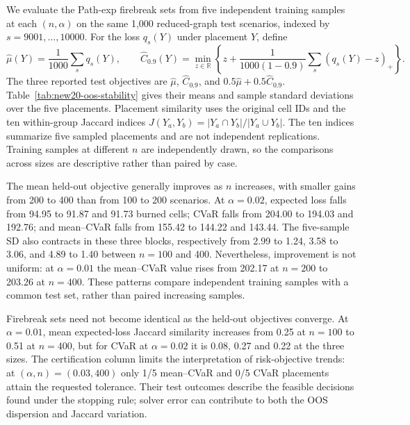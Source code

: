We evaluate the Path-exp firebreak sets from five independent training
samples at each $(n,\alpha)$ on the same 1,000 reduced-graph test
scenarios, indexed by $s=9001,\ldots,10000$. For the loss $q_s(Y)$
under placement $Y$, define
\[
 \widehat\mu(Y)=\frac{1}{1000}\sum_s q_s(Y),\qquad
 \widehat C_{0.9}(Y)=\min_{z\in\mathbb R}
 \left\{z+\frac{1}{1000(1-0.9)}\sum_s(q_s(Y)-z)_+\right\}.
\]
The three reported test objectives are $\widehat\mu$,
$\widehat C_{0.9}$, and $0.5\widehat\mu+0.5\widehat C_{0.9}$.
Table~\ref{tab:new20-oos-stability} gives their means and sample
standard deviations over the five placements. Placement similarity
uses the original cell IDs and the ten within-group Jaccard indices
$J(Y_a,Y_b)=|Y_a\cap Y_b|/|Y_a\cup Y_b|$. The ten indices summarize
five sampled placements and are not independent replications.
Training samples at different $n$ are independently drawn, so the
comparisons across sizes are descriptive rather than paired by case.

\begin{table}[p]
\centering\footnotesize
\setlength{\tabcolsep}{4pt}
\caption{Held-out burned-area objective and placement similarity for
Path-exp. Each mean and sample SD uses five firebreak sets evaluated on
the fixed 1,000-scenario test set. Jaccard means and ranges use their
ten within-group pairs; ``Certified'' counts placements whose sampled
optimization reached the relative MIP gap $10^{-3}$, out of five.
All five feasible placements enter each row.}
\label{tab:new20-oos-stability}

\end{table}

The mean held-out objective generally improves as $n$ increases, with
smaller gains from 200 to 400 than from 100 to 200 scenarios. At
$\alpha=0.02$, expected loss falls from 94.95 to 91.87 and 91.73
burned cells; CVaR falls from 204.00 to 194.03 and 192.76; and
mean--CVaR falls from 155.42 to 144.22 and 143.44. The five-sample
SD also contracts in these three blocks, respectively from 2.99 to
1.24, 3.58 to 3.06, and 4.89 to 1.40 between $n=100$ and 400.
Nevertheless, improvement is not uniform: at $\alpha=0.01$ the
mean--CVaR value rises from 202.17 at $n=200$ to 203.26 at
$n=400$. These patterns compare independent training samples with a
common test set, rather than paired increasing samples.

Firebreak sets need not become identical as the held-out objectives
converge. At $\alpha=0.01$, mean expected-loss Jaccard similarity
increases from 0.25 at $n=100$ to 0.51 at $n=400$, but for CVaR at
$\alpha=0.02$ it is 0.08, 0.27 and 0.22 at the three sizes.
The certification column limits the interpretation of risk-objective
trends: at $(\alpha,n)=(0.03,400)$ only 1/5 mean--CVaR and 0/5 CVaR
placements attain the requested tolerance. Their test outcomes
describe the feasible decisions found under the stopping rule; solver
error can contribute to both the OOS dispersion and Jaccard variation.

